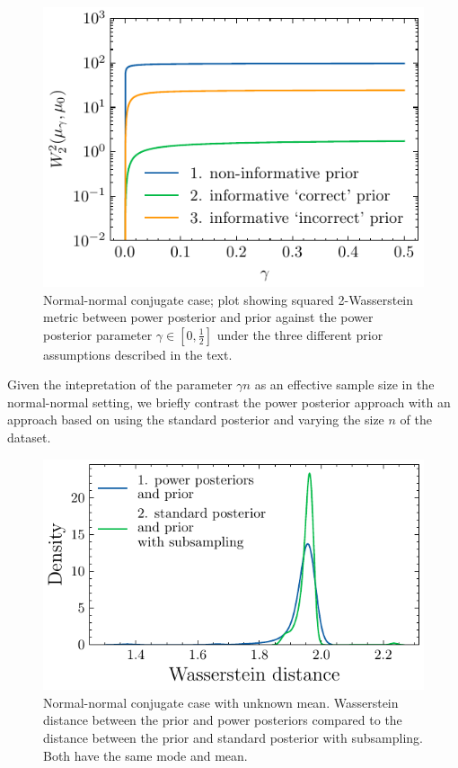 \documentclass[12pt]{article}
\begin{document}
\begin{figure}
\begin{center}
\includegraphics{imgs/normal_normal_wasserstein_distance_different_priors.pdf}
\end{center}
\caption{Normal-normal conjugate case; plot showing squared
2-Wasserstein metric between power posterior and prior against the
power posterior parameter $\gamma \in [0, \frac{1}{2}]$ under the three
different prior assumptions described in the text.}\label{fig:normal_normal_wasserstein_distance_different_priors}
\end{figure}

Given the intepretation of the parameter $\gamma n$ as an effective sample size
in the normal-normal setting, we briefly contrast the power posterior approach
with an approach based on using the standard posterior and varying the size $n$
of the dataset.

\FloatBarrier
\begin{figure}[ht!]
\begin{center}
\includegraphics{imgs/gauss_knownsigma_subsample.pdf}
\end{center}
\caption{Normal-normal conjugate case with unknown mean. Wasserstein distance between the prior and power posteriors compared to the distance between the prior and standard posterior with subsampling. Both have the same mode and mean.}\label{fig:normal_normal_compare_with_subsampling}
\end{figure}
\end{document}
